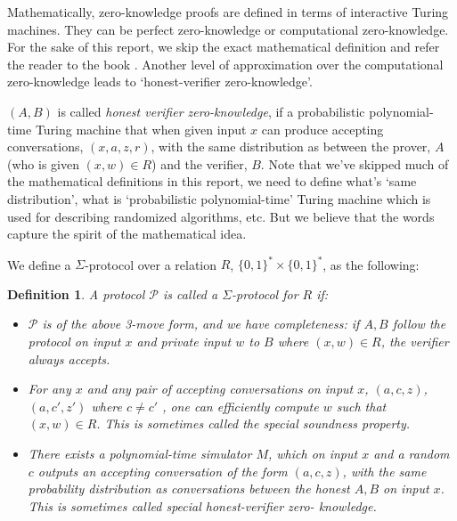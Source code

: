 \documentclass[12pt]{article}
\newtheorem{definition}{Definition}
\begin{document}
	Mathematically, zero-knowledge proofs are defined in terms of interactive Turing machines.  They can be perfect zero-knowledge or computational zero-knowledge.  For the sake of this report, we skip the exact mathematical definition and refer the reader to the book \cite{Goldreich_2001}. Another level of approximation over the computational zero-knowledge leads to `honest-verifier zero-knowledge'.
	
	$(A, B)$ is called \emph{honest verifier zero-knowledge}, if a probabilistic polynomial-time Turing machine that when given input $x$ can produce accepting conversations, $(x, a, z, r)$, with the same distribution as between the prover, $A$ (who is given $(x, w) \in R$) and the verifier, $B$.  Note that we've skipped much of the mathematical definitions in this report, we need to define what's `same distribution', what is `probabilistic polynomial-time' Turing machine which is used for describing randomized algorithms, etc.  But we believe that the words capture the spirit of the mathematical idea.
	
	
	We define a $\Sigma$-protocol over a relation $R$, $\{0, 1\}^* \times \{0, 1\}^*$, as the following:
	
	
	
	\begin{definition}
		\cite{damgaard2002sigma} A protocol $\mathcal{P}$ is called a $\Sigma$-protocol for $R$ if:
		
		\begin{itemize}
			\item $\mathcal{P}$ is of the above 3-move form, and we have completeness: if $A, B$
			follow the protocol on input $x$ and private input $w$ to $B$ where $(x, w) \in
			R$, the verifier always accepts.
			\item For any $x$ and any pair of accepting conversations on input $x$,
			$(a, c, z)$, $(a, c' , z')$ where $c \ne c'$ , one can efficiently compute $w$ such
			that $(x, w) \in R$. This is sometimes called the special soundness property.
			\item There exists a polynomial-time simulator $M$, which on input $x$ and a
			random $c$ outputs an accepting conversation of the form $(a, c, z)$, with
			the same probability distribution as conversations between the honest
			$A, B$ on input $x$. This is sometimes called special honest-verifier zero-
			knowledge.
			
		\end{itemize}
		
	\end{definition}
	
\end{document}
